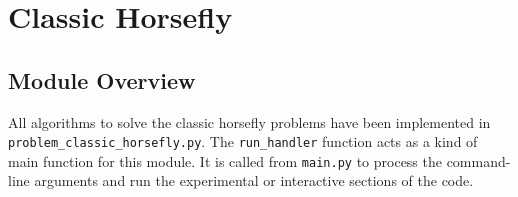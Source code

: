 \documentclass[11.5pt]{report}
\begin{document}
 
\chapter{Classic Horsefly}
\label{chap:classic-horsefly}

\section{Module Overview}

\newchunk 
All algorithms to solve the classic horsefly problems have been implemented in 
\verb|problem_classic_horsefly.py|. The \verb|run_handler| function acts 
as a kind of main function for this module. It is called from 
\verb|main.py| to process the command-line arguments and run the 
experimental or interactive sections of the code. 
\end{document}

